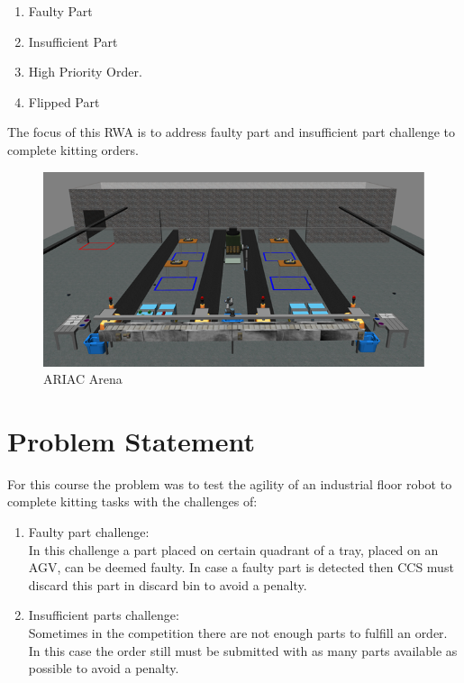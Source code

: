 \documentclass{uva-inf-article}
\begin{document}
\begin{minipage}{13.5cm}
\begin{enumerate}
    
    \item \justifying Faulty Part 
    \item \justifying Insufficient Part 
    \item \justifying High Priority Order.
    \item \justifying Flipped Part \\
\end{enumerate}
\end{minipage}

\noindent The focus of this RWA is to address faulty part and insufficient part challenge to complete kitting orders.\\

\begin{figure}[h]
\centering
\includegraphics{images/ARIAC.png}
\caption{ARIAC Arena}
\label{fig:swArch}
\end{figure}

\justifying
\section{Problem Statement}
For this course the problem was to test the agility of an industrial floor robot to complete kitting tasks with the challenges of:\\

\begin{minipage}{13.5cm}
\begin{enumerate}
    \item \justifying Faulty part challenge:\\
    In this challenge a part placed on certain quadrant of a tray, placed on an AGV, can be deemed faulty. In case a faulty part is detected then CCS must discard this part in discard bin to avoid a penalty.
    \item \justifying Insufficient parts challenge:\\
    Sometimes in the competition there are not enough parts to fulfill an order. In this case the order still must be submitted with as many parts available as possible to avoid a penalty.
\end{enumerate}
\end{minipage}
\end{document}
